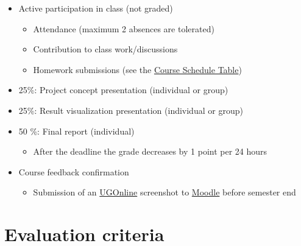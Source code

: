 \documentclass[
  letterpaper,
]{report}
\providecommand{\tightlist}{%
  \setlength{\itemsep}{0pt}\setlength{\parskip}{0pt}}\usepackage{longtable,booktabs,array}
\begin{document}

\begin{itemize}
\item
  Active participation in class (not graded)

  \begin{itemize}
  \item
    Attendance (maximum 2 absences are tolerated)
  \item
    Contribution to class work/discussions
  \item
    Homework submissions (see the \hyperref[tbl-schedule]{Course
    Schedule Table})
  \end{itemize}
\item
  25\%: Project concept presentation (individual or group)
\item
  25\%: Result visualization presentation (individual or group)
\item
  50 \%: Final report (individual)

  \begin{itemize}
  \tightlist
  \item
    After the deadline the grade decreases by 1 point per 24 hours
  \end{itemize}
\item
  Course feedback confirmation

  \begin{itemize}
  \tightlist
  \item
    Submission of an \href{https://online.uni-graz.at}{UGOnline}
    screenshot to \href{https://moodle.uni-graz.at}{Moodle} before
    semester end
  \end{itemize}
\end{itemize}

\section*{Evaluation criteria}\label{sec-presentation-evaluation}

\end{document}
